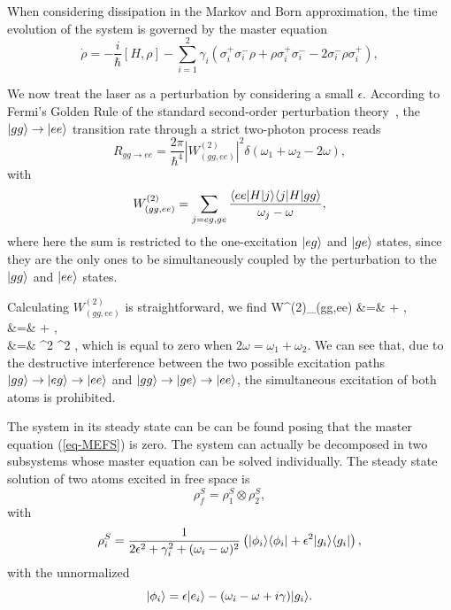 When considering dissipation in the Markov and Born approximation, the time evolution of the system is governed by the master equation
\begin{equation}
\dot\rho = - \frac{i}{\hbar} [H,\rho] -  \sum_{i=1}^2 \gamma_i (\sigma_i^+ \sigma_i^- \rho +\rho \sigma_i^+ \sigma_i^- -2 \sigma_i^- \rho \sigma_i^+), \label{eq-MEFS}
\end{equation}

We now treat the laser as a perturbation by considering a small $\epsilon$. 
According to Fermi's Golden Rule of the standard second-order perturbation theory~\cite{Lou00}, the $| gg \rangle \rightarrow | ee \rangle$ transition rate through a strict two-photon process reads
\[ R_{gg \rightarrow ee} = \frac{2 \pi}{\hbar^4}  |W^{(2)}_{(gg,ee)}|^2 \delta(\omega_1+\omega_2 - 2\omega), \]
with
\[ W^{(2)}_{(gg,ee)} = \sum_{j=eg,ge} \frac{ \langle ee | H | j \rangle\langle j | H | gg \rangle }{\omega_j-\omega}, \]
where here the sum is restricted to the one-excitation $| eg \rangle$ and $| ge \rangle$ states, since they are the only ones to be simultaneously coupled by the perturbation to the $| gg \rangle$ and $| ee \rangle$ states.

Calculating $W^{(2)}_{(gg,ee)}$ is straightforward, we find
\bea
 W^{(2)}_{(gg,ee)} &=& + , \\
 &=&  + , \\
 &=& \hbar^2 \epsilon^2  ,
\eea
which is equal to zero  when $2 \omega = \omega_1 + \omega_2$. We can see that, due to the destructive interference between the two possible excitation paths $| gg \rangle \rightarrow | eg \rangle \rightarrow  | ee \rangle$ and $| gg \rangle \rightarrow | ge \rangle \rightarrow  | ee \rangle$, the simultaneous excitation of both atoms is prohibited. 

The system in its steady state can be can be found posing that the master equation (\ref{eq-MEFS}) is zero. The system can actually be decomposed in two subsystems whose master equation can be solved individually. The steady state solution of two atoms excited in free space is
\[ \rho^S_f = \rho^S_1 \otimes \rho^S_2, \]
with
\[ \rho^S_i = \frac{1}{2\epsilon^2+ \gamma_i^2 + (\omega_i-\omega)^2} \left( | \phi_i \rangle \langle \phi_i | + \epsilon^2 | g_i \rangle \langle g_i |\right), \]
with the unnormalized
\[ | \phi_i \rangle = \epsilon | e_i \rangle - (\omega_i-\omega + i \gamma) | g_i \rangle.\]

